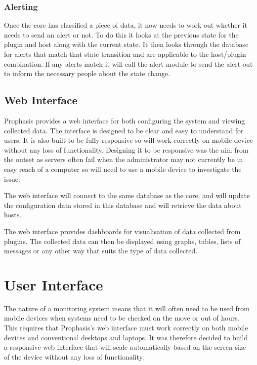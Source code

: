 \documentclass[bsc,deptreport,twoside,parskip,singlespacing,notimes]{infthesis}
\begin{document}
\subsubsection{Alerting}

	Once the core has classified a piece of data, it now needs to work out
	whether it needs to send an alert or not.  To do this it looks at the previous
	state for the plugin and host along with the current state.  It then looks
	through the database for alerts that match that state transition and are
	applicable to the host/plugin combination.  If any alerts match it will call
	the alert module to send the alert out to inform the necessary people about the
	state change.

\subsection{Web Interface}

	Prophasis provides a web interface for both configuring the system and viewing
	collected data.  The interface is designed to be clear and easy to understand
	for users.  It is also built to be fully responsive so will work correctly on
	mobile device without any loss of functionality.  Designing it to be responsive
	was the aim from the outset as servers often fail when the administrator may
	not currently be in easy reach of a computer so will need to use a mobile
	device to investigate the issue.


	The web interface will connect to the same database as the core, and will
	update the configuration data stored in this database and will retrieve
	the data about hosts.


	The web interface provides dashboards for visualisation of data collected from
	plugins.  The collected data can then be displayed using graphs, tables, lists
	of messages or any other way that suits the type of data collected.

\section{User Interface}

	The nature of a monitoring system means that it will often need to be used from
	mobile devices when systems need to be checked on the move or out of hours. This
	requires that Prophasis's web interface must work correctly on both mobile devices
	and conventional desktops and laptops.  It was therefore decided to build a
	responsive web interface that will scale automatically based on the screen size
	of the device without any loss of functionality.
\end{document}
